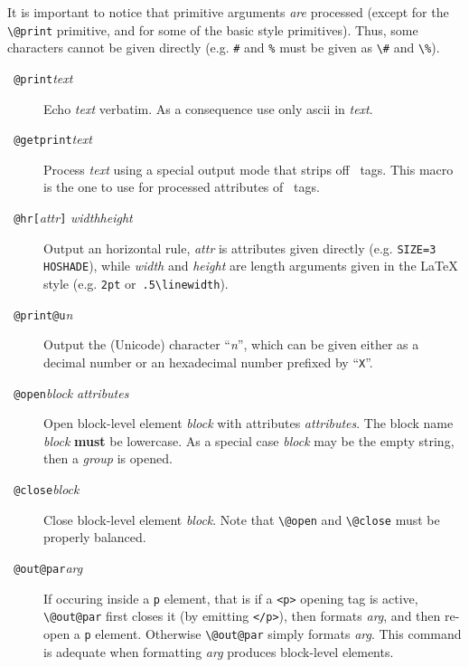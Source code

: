 It is important to notice that primitive arguments \emph{are}
processed (except for the \verb+\@print+ primitive, and for some of
the basic style primitives). Thus,
some characters cannot be given directly (e.g. \verb+#+ and
\verb+%+ must be given as \verb+\#+ and \verb+\%+).
\begin{description}
\item[{\tt{} @print}{\it text}{\tt{}}]
Echo \textit{text} verbatim. As a consequence use only ascii
in \textit{text}.
\item[{\tt{} @getprint}{\it text}{\tt{}}]
Process \textit{text} using a special output mode that strips off
\html~tags. This macro is the one to use for processed attributes of
\html~tags.
\item[{\tt{} @hr[}{\it attr}{\tt]}{\it
width}{\tt{}}{\it height}{\tt{}}]
Output an \html{} horizontal rule, \textit{attr} is attributes given
directly (e.g. \verb+SIZE=3 HOSHADE+), while \textit{width} and
\textit{height} are length arguments given in the \LaTeX{} style
(e.g. \verb+2pt+ or~\verb+.5\linewidth+).
\item[{\tt{} @print@u}{\it n}{\tt{}}]
Output the (Unicode) character ``\textit{n}'', which can
be given either as a decimal number or an hexadecimal number prefixed
by ``\texttt{X}''.

\item[{\tt{} @open}{\it block}{\tt{}}{\it
attributes}{\tt{}}]
Open \html{} block-level element \textit{block} with attributes
\textit{attributes}. The block name \textit{block} \textbf{must} be
lowercase.
As a special case \textit{block} may be the empty string, then a \html{}
\emph{group} is opened.
\item[{\tt{} @close}{\it block}{\tt{}}]
Close \html{} block-level element \textit{block}.
Note that \verb+\@open+ and \verb+\@close+ must be properly balanced.
\item[{\tt{} @out@par}{\it arg}{\tt{}}]
If occuring inside a \verb+p+ element,
that is if a \verb+<p>+ opening tag is active,
\verb+\@out@par+  first closes it (by emitting \verb+</p>+),
then formats \textit{arg}, and then re-open a \verb+p+ element.
Otherwise \verb+\@out@par+ simply formats \textit{arg}.
This command is adequate when
formatting \textit{arg} produces block-level elements.
\end{description}

